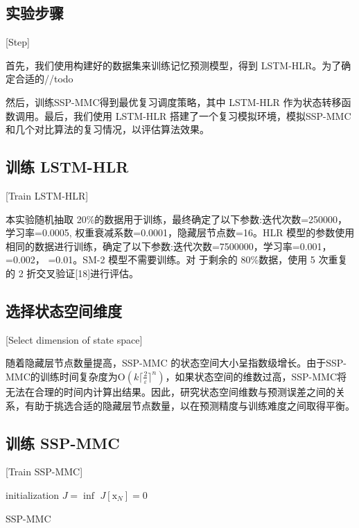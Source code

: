 \subsection{实验步骤}[Step]

首先，我们使用构建好的数据集来训练记忆预测模型，得到 LSTM-HLR。为了确定合适的//todo

然后，训练SSP-MMC得到最优复习调度策略，其中 LSTM-HLR 作为状态转移函数调用。最后，我们使用 LSTM-HLR 搭建了一个复习模拟环境，模拟SSP-MMC和几个对比算法的复习情况，以评估算法效果。

\subsection{训练 LSTM-HLR}[Train LSTM-HLR]

本实验随机抽取 20\%的数据用于训练，最终确定了以下参数:迭代次数=250000，学习率=0.0005, 权重衰减系数=0.0001，隐藏层节点数=16。HLR 模型的参数使用相同的数据进行训练，确定了以下参数:迭代次数=7500000，学习率=0.001， =0.002， =0.01。SM-2 模型不需要训练。对 于剩余的 80\%数据，使用 5 次重复的 2 折交叉验证[18]进行评估。

\subsection{选择状态空间维度}[Select dimension of state space]

随着隐藏层节点数量提高，SSP-MMC 的状态空间大小呈指数级增长。由于SSP-MMC的训练时间复杂度为$\mathrm O(k\lceil\frac{2}{\varepsilon}\rceil^n)$，如果状态空间的维数过高，SSP-MMC将无法在合理的时间内计算出结果。因此，研究状态空间维数与预测误差之间的关系，有助于挑选合适的隐藏层节点数量，以在预测精度与训练难度之间取得平衡。

\subsection{训练 SSP-MMC}[Train SSP-MMC]

\begin{algorithm}[htbp]
    initialization\;
    $J = \inf$\;
    $J[\boldsymbol{\mathrm{x}}_{N}] = 0$\;
\caption{SSP-MMC}
\label{alg:ssp_mmc}
\end{algorithm}

